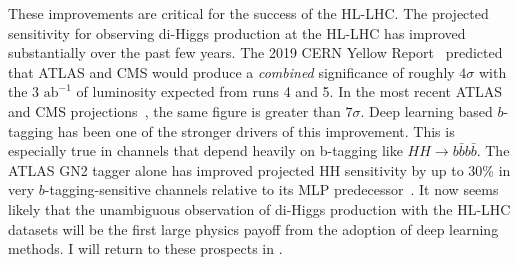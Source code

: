 These improvements are critical for the success of the HL-LHC.
The projected sensitivity for observing di-Higgs production at the HL-LHC has improved substantially over the past few years.
The 2019 CERN Yellow Report~\cite{Cepeda:2019klc} predicted that ATLAS and CMS would produce a \textit{combined} significance of roughly $4\sigma$ with the $3$ $\mathrm{ab}^{-1}$ of luminosity expected from runs 4 and 5.
In the most recent ATLAS and CMS projections~\cite{ATLAS:2025eii}, the same figure is greater than $7\sigma$.
Deep learning based $b$-tagging has been one of the stronger drivers of this improvement.
This is especially true in channels that depend heavily on b-tagging like $HH \to b\bar{b}b\bar{b}$.
The ATLAS GN2 tagger alone has improved projected HH sensitivity by up to 30\% in very $b$-tagging-sensitive channels relative to its MLP predecessor~\cite{ATLAS:2025dkv}.
It now seems likely that the unambiguous observation of di-Higgs production with the HL-LHC datasets will be the first large physics payoff from the adoption of deep learning methods.
I will return to these prospects in .
